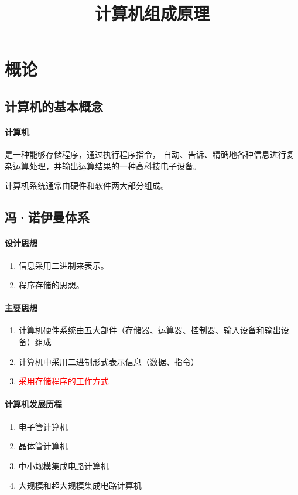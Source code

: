 \documentclass[a4paper, 12pt, oneside]{ctexart}
\begin{document}
	\title{计算机组成原理}
	\section{概论}
	\subsection{计算机的基本概念}
	\paragraph{计算机}
	是一种能够存储程序，通过执行程序指令， 自动、告诉、精确地各种信息进行复杂运算处理，并输出运算结果的一种高科技电子设备。
	
	计算机系统通常由硬件和软件两大部分组成。
	
	\subsection{冯·诺伊曼体系}
	\paragraph{设计思想}
	\begin{enumerate}
		\item 信息采用二进制来表示。
		\item 程序存储的思想。
	\end{enumerate}
	\paragraph{主要思想}
	\begin{enumerate}
		\item 计算机硬件系统由五大部件（存储器、运算器、控制器、输入设备和输出设备）组成
		\item 计算机中采用二进制形式表示信息（数据、指令）
		\item \textcolor{red}{采用存储程序的工作方式}
	\end{enumerate}
	\paragraph{计算机发展历程}
	\begin{enumerate}
		\item 电子管计算机
		\item 晶体管计算机
		\item 中小规模集成电路计算机
		\item 大规模和超大规模集成电路计算机
	\end{enumerate}
\end{document}
